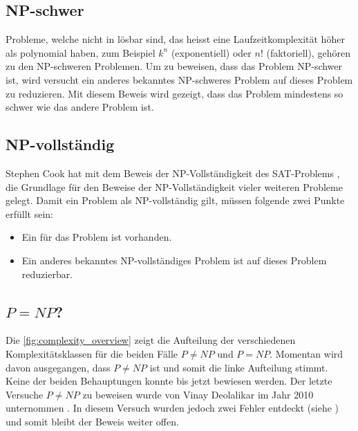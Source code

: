 \subsection{NP-schwer}\label{np_hard}
Probleme, welche nicht in  lösbar sind, das heisst eine Laufzeitkomplexität höher als polynomial haben, zum Beispiel $k^n$ (exponentiell) oder $n!$ (faktoriell), 
gehören zu den NP-schweren Problemen. Um zu beweisen, dass das Problem NP-schwer ist, wird versucht ein anderes bekanntes NP-schweres Problem auf dieses Problem zu reduzieren. Mit 
diesem Beweis wird gezeigt, dass das Problem mindestens so schwer wie das andere Problem ist.

\subsection{NP-vollständig}\label{np_complet}
Stephen Cook hat mit dem Beweis der NP-Vollständigkeit des SAT-Problems \cite{cook_complexity}, die Grundlage für den Beweise der NP-Vollständigkeit vieler weiteren Probleme 
gelegt. Damit ein Problem als NP-vollständig gilt, müssen folgende zwei Punkte erfüllt sein:
\begin{itemize}
	\item Ein  für das Problem ist vorhanden.
	\item Ein anderes bekanntes NP-vollständiges Problem ist auf dieses Problem reduzierbar.
\end{itemize}

\subsection{$P = NP$?}
Die \autoref{fig:complexity_overview} zeigt die Aufteilung der verschiedenen Komplexitätsklassen für die beiden Fälle $P \neq NP$ und $P=NP$. Momentan wird davon ausgegangen, 
dass $P \neq NP$ ist und somit die linke Aufteilung stimmt. Keine der beiden Behauptungen konnte bis jetzt bewiesen werden. Der letzte Versuche $P \neq NP$ zu beweisen wurde von 
Vinay Deolalikar im Jahr 2010 unternommen \cite{p_neq_np_paper}. In diesem Versuch wurden jedoch zwei Fehler entdeckt (siehe \cite{p_neq_np_paper_blog}) und somit bleibt der 
Beweis weiter offen.

